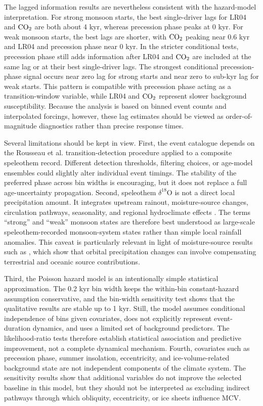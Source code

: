 \documentclass[11pt]{article}
\begin{document}
The lagged information results are nevertheless consistent with the hazard-model interpretation. For strong monsoon starts, the best single-driver lags for LR04 and \(\ce{CO2}\) are both about 4 kyr, whereas precession phase peaks at 0 kyr. For weak monsoon starts, the best lags are shorter, with \(\ce{CO2}\) peaking near 0.6 kyr and LR04 and precession phase near 0 kyr. In the stricter conditional tests, precession phase still adds information after LR04 and \(\ce{CO2}\) are included at the same lag or at their best single-driver lags. The strongest conditional precession-phase signal occurs near zero lag for strong starts and near zero to sub-kyr lag for weak starts. This pattern is compatible with precession phase acting as a transition-window variable, while LR04 and \(\ce{CO2}\) represent slower background susceptibility. Because the analysis is based on binned event counts and interpolated forcings, however, these lag estimates should be viewed as order-of-magnitude diagnostics rather than precise response times.

Several limitations should be kept in view. First, the event catalogue depends on the Rousseau et al. transition-detection procedure applied to a composite speleothem record. Different detection thresholds, filtering choices, or age-model ensembles could slightly alter individual event timings. The stability of the preferred phase across bin widths is encouraging, but it does not replace a full age-uncertainty propagation. Second, speleothem \(\delta^{18}\mathrm{O}\) is not a direct local precipitation amount. It integrates upstream rainout, moisture-source changes, circulation pathways, seasonality, and regional hydroclimate effects \citep{liu2014, cheng2021, wang2022}. The terms ``strong'' and ``weak'' monsoon states are therefore best understood as large-scale speleothem-recorded monsoon-system states rather than simple local rainfall anomalies. This caveat is particularly relevant in light of moisture-source results such as \citet{xie2023}, which show that orbital precipitation changes can involve compensating terrestrial and oceanic source contributions.

Third, the Poisson hazard model is an intentionally simple statistical approximation. The 0.2 kyr bin width keeps the within-bin constant-hazard assumption conservative, and the bin-width sensitivity test shows that the qualitative results are stable up to 1 kyr. Still, the model assumes conditional independence of bins given covariates, does not explicitly represent event-duration dynamics, and uses a limited set of background predictors. The likelihood-ratio tests therefore establish statistical association and predictive improvement, not a complete dynamical mechanism. Fourth, covariates such as precession phase, summer insolation, eccentricity, and ice-volume-related background state are not independent components of the climate system. The sensitivity results show that additional variables do not improve the selected baseline in this model, but they should not be interpreted as excluding indirect pathways through which obliquity, eccentricity, or ice sheets influence MCV.
\end{document}
